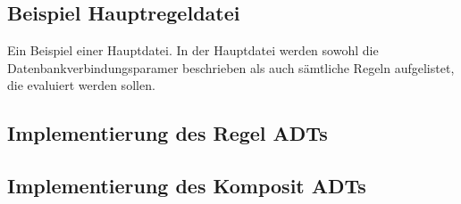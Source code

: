 \subsection{Beispiel Hauptregeldatei}
\label{app:MasterDatei}
Ein Beispiel einer Hauptdatei. In der Hauptdatei werden sowohl die Datenbankverbindungsparamer beschrieben als auch sämtliche Regeln aufgelistet, die evaluiert werden sollen.


\subsection{Implementierung des Regel \acs{ADT}s}
\label{app:RegelADT}

\clearpage

\subsection{Implementierung des Komposit \acs{ADT}s}
\label{app:CompositeADT}



